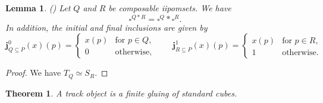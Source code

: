 \documentclass[11pt,a4paper,oldfontcommands]{memoir}
\newcommand{\Dom}[1] {\mathcal{D}_{#1}}
\newcommand*\exec{%
  \raisebox{1pt}{%
    \begin{tikzpicture}[x=.8ex,y=1ex,-]
      \draw (0,0) -- (1,0) -- (1,1) -- (2,1);
    \end{tikzpicture}}}
\newcommand*\pobj[1]{\square^{#1}}
\newcommand*\jneda{\mathbf{j}}
\newtheorem{theorem}[definition]{Theorem}
\newtheorem{lemma}[definition]{Lemma}
\begin{document}
\begin{lemma}{(\cite{LanguageofHDA})} \label{lemma: pomset pushout}
    Let $Q$ and $R$ be composable iipomsets. %
    We have $$\pobj{ Q*R} =\pobj{ Q}*\pobj{ R}.$$
In addition, the initial and final inclusions are given by
   \begin{equation*}
    \jneda^0_{Q\subseteq P}(x)(p)=
    \begin{cases}
      x(p) & \text{for $p\in Q$}, \\
      0 & \text{otherwise},
    \end{cases}
    \qquad
    \jneda^1_{R\subseteq P}(x)(p)=
    \begin{cases}
      x(p) & \text{for $p\in R$}, \\
      1 & \text{otherwise}.
    \end{cases}
  \end{equation*}
\end{lemma}
\begin{proof}
    We have $T_Q\simeq S_R$.
\end{proof}
\begin{theorem}\label{theo: finite gluing of standard cubes}
    A track object is a finite gluing of standard cubes.
\end{theorem}
\end{document}

